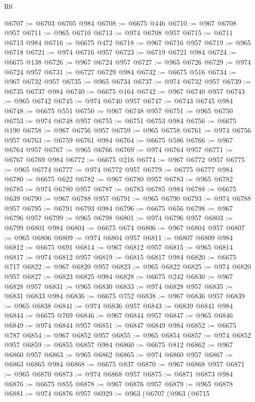 \begin{lexlean}{R6}
\begin{coremodule}
@6707 := @6703 @6705 @984
@6708 := @6675 @446
@6710 := @967 @6708 @957
@6711 := @965 @6710
@6713 := @974 @6708 @957
@6715 := @6711 @6713 @984
@6716 := @6675 @472
@6718 := @967 @6716 @957
@6719 := @965 @6718
@6721 := @974 @6716 @957
@6723 := @6719 @6721 @984
@6724 := @6675 @138
@6726 := @967 @6724 @957
@6727 := @965 @6726
@6729 := @974 @6724 @957
@6731 := @6727 @6729 @984
@6732 := @6675 @516
@6734 := @967 @6732 @957
@6735 := @965 @6734
@6737 := @974 @6732 @957
@6739 := @6735 @6737 @984
@6740 := @6675 @164
@6742 := @967 @6740 @957
@6743 := @965 @6742
@6745 := @974 @6740 @957
@6747 := @6743 @6745 @984
@6748 := @6675 @551
@6750 := @967 @6748 @957
@6751 := @965 @6750
@6753 := @974 @6748 @957
@6755 := @6751 @6753 @984
@6756 := @6675 @190
@6758 := @967 @6756 @957
@6759 := @965 @6758
@6761 := @974 @6756 @957
@6763 := @6759 @6761 @984
@6764 := @6675 @586
@6766 := @967 @6764 @957
@6767 := @965 @6766
@6769 := @974 @6764 @957
@6771 := @6767 @6769 @984
@6772 := @6675 @216
@6774 := @967 @6772 @957
@6775 := @965 @6774
@6777 := @974 @6772 @957
@6779 := @6775 @6777 @984
@6780 := @6675 @622
@6782 := @967 @6780 @957
@6783 := @965 @6782
@6785 := @974 @6780 @957
@6787 := @6783 @6785 @984
@6788 := @6675 @639
@6790 := @967 @6788 @957
@6791 := @965 @6790
@6793 := @974 @6788 @957
@6795 := @6791 @6793 @984
@6796 := @6675 @656
@6798 := @967 @6796 @957
@6799 := @965 @6798
@6801 := @974 @6796 @957
@6803 := @6799 @6801 @984
@6804 := @6675 @674
@6806 := @967 @6804 @957
@6807 := @965 @6806
@6809 := @974 @6804 @957
@6811 := @6807 @6809 @984
@6812 := @6675 @691
@6814 := @967 @6812 @957
@6815 := @965 @6814
@6817 := @974 @6812 @957
@6819 := @6815 @6817 @984
@6820 := @6675 @717
@6822 := @967 @6820 @957
@6823 := @965 @6822
@6825 := @974 @6820 @957
@6827 := @6823 @6825 @984
@6828 := @6675 @242
@6830 := @967 @6828 @957
@6831 := @965 @6830
@6833 := @974 @6828 @957
@6835 := @6831 @6833 @984
@6836 := @6675 @752
@6838 := @967 @6836 @957
@6839 := @965 @6838
@6841 := @974 @6836 @957
@6843 := @6839 @6841 @984
@6844 := @6675 @769
@6846 := @967 @6844 @957
@6847 := @965 @6846
@6849 := @974 @6844 @957
@6851 := @6847 @6849 @984
@6852 := @6675 @787
@6854 := @967 @6852 @957
@6855 := @965 @6854
@6857 := @974 @6852 @957
@6859 := @6855 @6857 @984
@6860 := @6675 @812
@6862 := @967 @6860 @957
@6863 := @965 @6862
@6865 := @974 @6860 @957
@6867 := @6863 @6865 @984
@6868 := @6675 @837
@6870 := @967 @6868 @957
@6871 := @965 @6870
@6873 := @974 @6868 @957
@6875 := @6871 @6873 @984
@6876 := @6675 @855
@6878 := @967 @6876 @957
@6879 := @965 @6878
@6881 := @974 @6876 @957
@6929 := @963
    (@6707
      (@963
        (@6715

\end{coremodule}
\end{lexlean}
